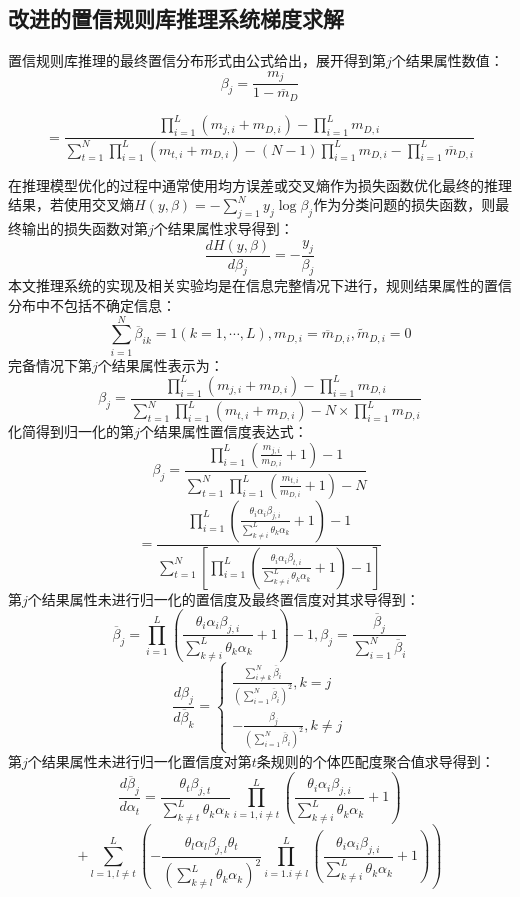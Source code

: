 \documentclass{cjc}
\begin{document}
\subsection{改进的置信规则库推理系统梯度求解}
置信规则库推理的最终置信分布形式由公式给出，展开得到第$j$个结果属性数值：
$$\beta_j=\frac{m_j}{1-\overline{m}_D}$$
\begin{small}
$$=\frac{\prod_{i=1}^L(m_{j,i}+m_{D,i})-\prod_{i=1}^Lm_{D,i}}{\sum_{t=1}^N\prod_{i=1}^L(m_{t,i}+m_{D,i})-(N-1)\prod_{i=1}^Lm_{D,i}-\prod_{i=1}^L\overline{m}_{D,i}}$$
\end{small}
在推理模型优化的过程中通常使用均方误差或交叉熵\cite{a16}作为损失函数优化最终的推理结果，若使用交叉熵$H(y,\beta)=-\sum_{j=1}^Ny_j\log\beta_j$作为分类问题的损失函数，则最终输出的损失函数对第$j$个结果属性求导得到：
$$\frac{dH(y,\beta)}{d\beta_j}=-\frac{y_j}{\beta_j}$$
本文推理系统的实现及相关实验均是在信息完整情况下进行，规则结果属性的置信分布中不包括不确定信息：
$$\sum_{i=1}^N\overline{\beta}_{ik}=1(k=1,\cdots,L),m_{D,i}=\overline{m}_{D,i},\widetilde{m}_{D,i}=0$$
完备情况下第$j$个结果属性表示为：
$$\beta_j=\frac{\prod_{i=1}^L(m_{j,i}+m_{D,i})-\prod_{i=1}^Lm_{D,i}}{\sum_{t=1}^N\prod_{i=1}^L(m_{t,i}+m_{D,i})-N\times\prod_{i=1}^Lm_{D,i}}$$
化简得到归一化的第$j$个结果属性置信度表达式：
$$\beta_j=\frac{\prod_{i=1}^{L}(\frac{m_{j,i}}{m_{D,i}}+1)-1}{\sum_{t=1}^{N}\prod_{i=1}^{L}(\frac{m_{t,i}}{m_{D,i}}+1)-N}$$
$$=\frac{\prod_{i=1}^{L}(\frac{\theta_i\alpha_i\beta_{j,i}}{\sum_{k\neq i}^L{\theta_k\alpha_k}}+1)-1}{\sum_{t=1}^{N}[\prod_{i=1}^{L}(\frac{\theta_i\alpha_i\beta_{t,i}}{\sum_{k\neq i}^L{\theta_k\alpha_k}}+1)-1]}$$
第$j$个结果属性未进行归一化的置信度及最终置信度对其求导得到：
$$\overline{\beta}_j=\prod_{i=1}^L(\frac{\theta_i\alpha_i\beta_{j,i}}{\sum_{k\neq i}^L{\theta_k\alpha_k}}+1)-1,\beta_j=\frac{\overline{\beta}_j}{\sum_{i=1}^N\overline{\beta}_i}$$
$$\frac{d\beta_j}{d\overline{\beta}_k}=
\left\{
\begin{aligned}
\frac{\sum_{i\neq k}^N\overline{\beta}_i}{(\sum_{i=1}^N\overline{\beta}_i)^2},k=j\\
-\frac{\beta_j}{(\sum_{i=1}^N\overline{\beta}_i)^2},k\neq j
\end{aligned}
\right.
$$
第$j$个结果属性未进行归一化置信度对第$t$条规则的个体匹配度聚合值求导得到：
$$\frac{d\overline{\beta}_j}{d\alpha_t}=\frac{\theta_t\beta_{j,t}}{\sum_{k\neq t}^L\theta_k\alpha_k}\prod_{i=1,i\neq t}^L(\frac{\theta_i\alpha_i\beta_{j,i}}{\sum_{k\neq i}^L{\theta_k\alpha_k}}+1)$$
$$+\sum_{l=1,l\neq t}^L(-\frac{\theta_l\alpha_l\beta_{j,l}\theta_t}{(\sum_{k\neq l}^L\theta_k\alpha_k)^2}\prod_{i=1.i\neq l}^L(\frac{\theta_i\alpha_i\beta_{j,i}}{\sum_{k\neq i}^L{\theta_k\alpha_k}}+1))$$
\end{document}
